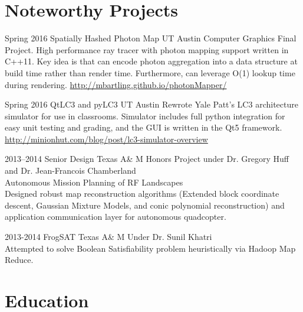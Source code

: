 \documentclass[]{friggeri-cv} %
\begin{document}
\section{Noteworthy Projects}

\begin{entrylist}
\entry
{Spring 2016}
{Spatially Hashed Photon Map}
{UT Austin}
{Computer Graphics Final Project. High performance ray tracer with photon mapping support written in C++11. Key idea is that can encode photon aggregation into a data structure at build time rather than render time. 
Furthermore, can leverage O(1) lookup time during rendering. \url{http://mbartling.github.io/photonMapper/}}

\entry
{Spring 2016}
{QtLC3 and pyLC3}
{UT Austin}
{Rewrote Yale Patt's LC3 architecture simulator for use in classrooms. Simulator includes full python integration for easy unit testing and grading, and the GUI is written in the Qt5 framework. \url{http://minionhut.com/blog/post/lc3-simulator-overview}}

\entry
{2013--2014}
{Senior Design}
{Texas A\& M}
{Honors Project under Dr. Gregory Huff and Dr. Jean-Francois Chamberland  \\
Autonomous Mission Planning of RF Landscapes \\
Designed robust map reconstruction algorithms (Extended block coordinate descent, Gaussian Mixture Models, and conic polynomial reconstruction) and application communication layer for autonomous quadcopter.}


\entry
{2013-2014}
{FrogSAT}
{Texas A\& M}
{Under Dr. Sunil Khatri \\
Attempted to solve Boolean Satisfiability problem heuristically via Hadoop Map Reduce.} 


\end{entrylist}



\section{Education}
\end{document}
